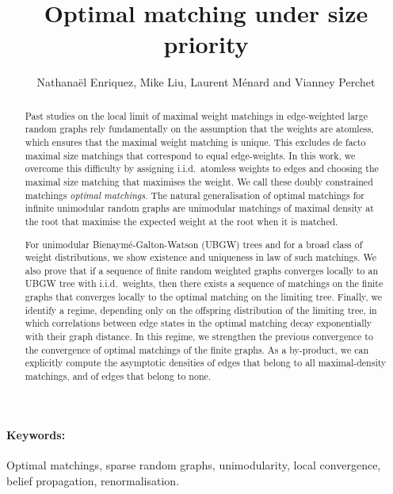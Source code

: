 \documentclass[11pt]{article}
\begin{document}
\title{Optimal matching under size priority}
\author{Nathanaël Enriquez, Mike Liu, Laurent Ménard and Vianney Perchet}

\theoremstyle{remark}
\newtheorem{remark}{Remark}

\vfill

\maketitle

\vfill

\begin{abstract}
Past studies on the local limit of maximal weight matchings in edge-weighted large random graphs rely fundamentally on the assumption that the weights are atomless, which ensures that the maximal weight matching is unique. This excludes de facto maximal size matchings that correspond to equal edge-weights.
In this work, we overcome this difficulty by assigning i.i.d.~atomless weights to edges and choosing the maximal size matching that maximises the weight. We call these doubly constrained matchings \emph{optimal matchings}.
The natural generalisation of optimal matchings for infinite unimodular random graphs are unimodular matchings of maximal density at the root that maximise the expected weight at the root when it is matched. 

For unimodular Bienaymé-Galton-Watson (UBGW) trees and for a broad class of weight distributions, we show existence and uniqueness in law of such matchings. We also prove that if a sequence of finite random weighted graphs converges locally to an UBGW tree with i.i.d.~weights, then there exists a sequence of matchings on the finite graphs that converges locally to the optimal matching on the limiting tree.
Finally, we identify a regime, depending only on the offspring distribution of the limiting tree, in which correlations between edge states in the optimal matching decay exponentially with their graph distance. In this regime, we strengthen the previous convergence to the convergence of optimal matchings of the finite graphs.
As a by-product, we can explicitly compute the asymptotic densities of edges that belong to all maximal-density matchings, and of edges that belong to none.
\end{abstract}

\vfill

\paragraph{Keywords:} Optimal matchings, sparse random graphs, unimodularity, local convergence, belief propagation, renormalisation.
\end{document}
